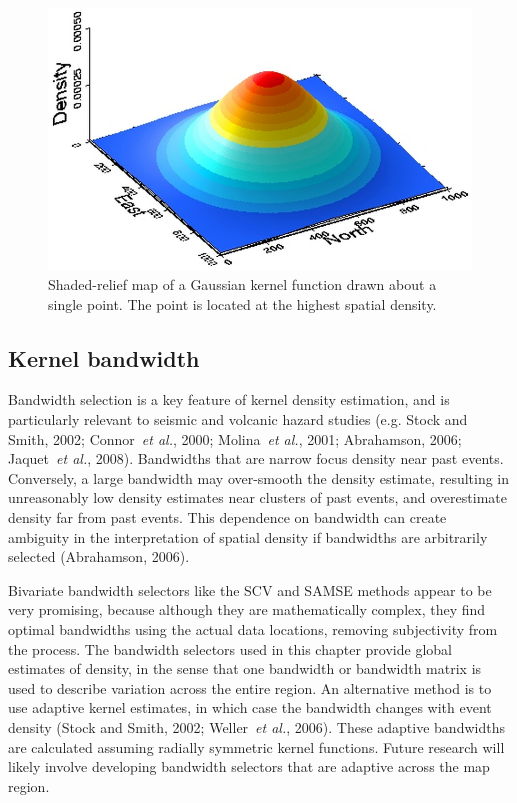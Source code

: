 \documentclass[10pt]{article}
\begin{document}
\begin{figure}[!ht]
    \centering
    \includegraphics[scale=.30]{figures/kernel.png}
    \caption{Shaded-relief map of a Gaussian kernel function drawn about a single point. The point is located at the highest spatial density.}
    \label{fig_kernel}
\end{figure}

\subsection{Kernel bandwidth}
Bandwidth selection is a key feature of kernel density estimation, and is particularly relevant to seismic and volcanic hazard studies (e.g. Stock and Smith, 2002; Connor~{\it et al.}, 2000; Molina~{\it et al.}, 2001; Abrahamson, 2006;  Jaquet~{\it et al.}, 2008).  Bandwidths that are narrow focus density near past events. Conversely, a large bandwidth may over-smooth the density estimate, resulting in unreasonably low density estimates near clusters of past events, and overestimate density far from past events. This dependence on bandwidth can create ambiguity in the interpretation of spatial density if bandwidths are arbitrarily selected (Abrahamson, 2006).

 Bivariate bandwidth selectors like the SCV and SAMSE methods appear to be very promising, because although they are mathematically complex, they find optimal bandwidths using the actual data locations, removing subjectivity from the process. The bandwidth selectors used in this chapter provide global estimates of density, in the sense that one bandwidth or bandwidth matrix is used to describe variation across the entire region. An alternative method is to use adaptive kernel estimates, in which case the bandwidth changes with event density (Stock and Smith, 2002; Weller~{\it et al.}, 2006). These adaptive bandwidths are calculated assuming radially symmetric kernel functions. Future research will likely involve developing bandwidth selectors that are adaptive across the map region.
\end{document}

